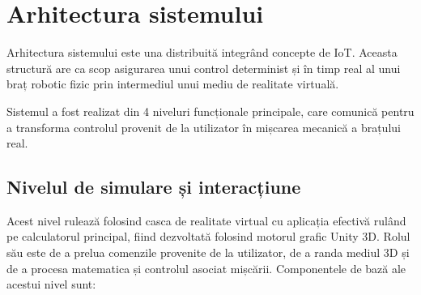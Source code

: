 


\clearpage

\section {Arhitectura sistemului }
Arhitectura sistemului este una distribuită integrând concepte de IoT.  Aceasta structură are ca scop asigurarea unui control determinist și în timp real al unui braț robotic fizic prin intermediul unui mediu de realitate virtuală.

 Sistemul a fost realizat din 4 niveluri funcționale principale, care comunică pentru a transforma controlul provenit de la utilizator în mișcarea mecanică a brațului real.

\subsection{Nivelul de simulare și interacțiune}
Acest nivel rulează folosind casca de realitate virtual cu aplicația efectivă rulând pe calculatorul principal, fiind dezvoltată folosind motorul grafic Unity 3D. Rolul său este de a prelua comenzile provenite de la utilizator, de a randa mediul 3D și de a procesa matematica și controlul asociat mișcării. Componentele de bază ale acestui nivel sunt:


